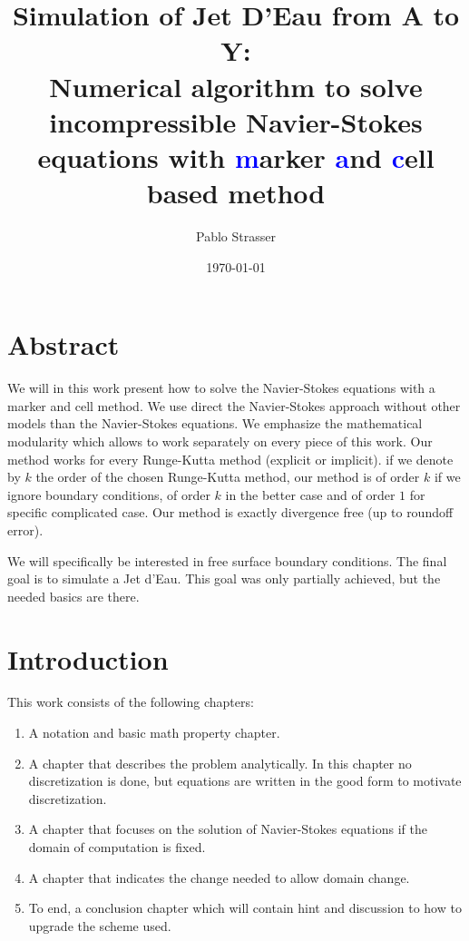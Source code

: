 \documentclass[a4paper]{master}
\title{Simulation of Jet D'Eau from A to Y:\\ Numerical algorithm to solve incompressible Navier-Stokes equations
with \textcolor{blue}{m}arker \textcolor{blue}{a}nd \textcolor{blue}{c}ell based method}
\author{Pablo Strasser}
\date{\today}
\begin{document}
\captionsetup{singlelinecheck=off,margin=10pt,font=small,labelfont=bf}
\maketitle
\dominitoc

\chapter*{Abstract}

\mtcaddchapter[Abstract]

We will in this work present how to solve the Navier-Stokes equations with a marker and cell method.
We use direct the Navier-Stokes approach without other models than the Navier-Stokes equations.
We emphasize the mathematical modularity which allows to work separately on every piece of this work.
Our method works for every Runge-Kutta method (explicit or implicit). if we denote by $k$ the order of the chosen Runge-Kutta method,
our method is of order $k$ if we ignore boundary conditions, of order $k$ in the better case and of order $1$ for specific complicated case.
Our method is exactly divergence free (up to roundoff error).

We will specifically be interested in free surface boundary conditions. The final goal is to simulate a Jet d'Eau.
This goal was only partially achieved, but the needed basics are there. 


\tableofcontents

\chapter*{Introduction}

\mtcaddchapter[Introduction]

This work consists of the following chapters:
\begin{enumerate}
 \item A notation and basic math property chapter.
 \item A chapter that describes the problem analytically. In this chapter no discretization is done, but equations are written in the good form to motivate discretization.
 \item A chapter that focuses on the solution of Navier-Stokes equations if the domain of computation is fixed.
 \item A chapter that indicates the change needed to allow domain change.
 \item To end, a conclusion chapter which will contain hint and discussion to how to upgrade the scheme used.
\end{enumerate}
\end{document}
